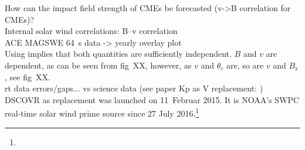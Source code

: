 How can the impact field strength of CMEs be forecasted (v->B correlation for CMEs)?\\
Internal solar wind correlations: B--v correlation\\
ACE MAGSWE 64~s data -> yearly overlay plot\\

Using \vBz{} implies that both quantities are sufficiently independent. $B$ and $v$ are dependent, as can be seen from fig~XX, however, as $v$ and $\theta_c$ are, so are $v$ and $B_\text{z}$, see fig~XX.\\

rt data errors/gaps... vs science data (see paper Kp as V replacement: \citet{Machol2013})\\
DSCOVR as replacement was launched on 11~Februar 2015. It is NOAA's SWPC real-time solar wind prime source since 27 July 2016.\footnote{}\\


